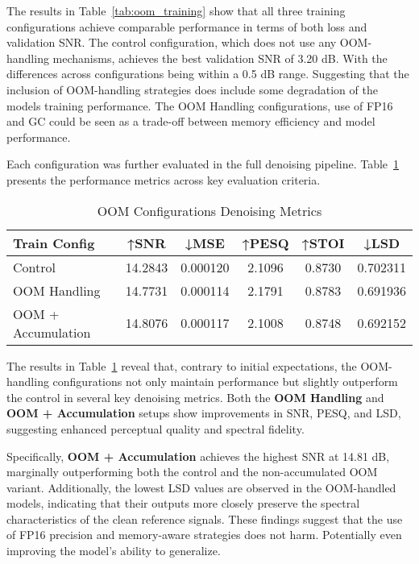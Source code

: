 The results in Table~\ref{tab:oom_training} show that all three training configurations achieve comparable performance in terms of both loss and validation SNR. The control configuration, which does not use any OOM-handling mechanisms, achieves the best validation SNR of 3.20 dB. With the differences across configurations being within a 0.5 dB range. Suggesting that the inclusion of OOM-handling strategies does include some degradation of the models training performance. The OOM Handling configurations, use of FP16 and GC could be seen as a trade-off between memory efficiency and model performance. 

Each configuration was further evaluated in the full denoising pipeline. Table~\ref{tab:oom_metrics} presents the performance metrics across key evaluation criteria.

\vspace{1em}
\begin{table}[H]
\centering
\caption{OOM Configurations Denoising Metrics}
\label{tab:oom_metrics}
\begin{tabular}{|l|c|c|c|c|c|}
\hline
\textbf{Train Config} & \textbf{↑SNR} & \textbf{↓MSE} & \textbf{↑PESQ} & \textbf{↑STOI} & \textbf{↓LSD} \\
\hline
Control              &  14.2843 & 0.000120 & 2.1096 & 0.8730 & 0.702311 \\
OOM Handling           & 14.7731 & 0.000114 & 2.1791 & 0.8783 & 0.691936 \\
OOM + Accumulation     & 14.8076 & 0.000117 & 2.1008 & 0.8748 & 0.692152 \\
\hline
\end{tabular}
\end{table}

The results in Table~\ref{tab:oom_metrics} reveal that, contrary to initial expectations, the OOM-handling configurations not only maintain performance but slightly outperform the control in several key denoising metrics. Both the \textbf{OOM Handling} and \textbf{OOM + Accumulation} setups show improvements in SNR, PESQ, and LSD, suggesting enhanced perceptual quality and spectral fidelity.

Specifically, \textbf{OOM + Accumulation} achieves the highest SNR at 14.81 dB, marginally outperforming both the control and the non-accumulated OOM variant. Additionally, the lowest LSD values are observed in the OOM-handled models, indicating that their outputs more closely preserve the spectral characteristics of the clean reference signals. These findings suggest that the use of FP16 precision and memory-aware strategies does not harm. Potentially even improving the model's ability to generalize. 

